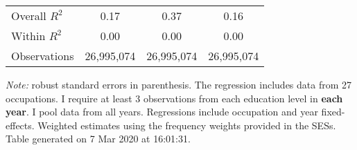 \begin{center}
\begin{threeparttable}[!h]
\begin{tabular}{lccc}
\midrule Overall $ R^2$&        0.17         &        0.37         &        0.16         \\
Within $ R^2$       &        0.00         &        0.00         &        0.00         \\
Observations        &  26,995,074         &  26,995,074         &  26,995,074         \\
\bottomrule
\bottomrule
\end{tabular}
\begin{tablenotes}
\item\footnotesize\textit{Note:} robust standard errors in parenthesis. The regression includes data from 27 occupations. I require at least 3 observations from each education level in \textbf{each year}. I pool data from all years. Regressions include occupation and year fixed-effects. Weighted estimates using the frequency weights provided in the SESs. Table generated on  7 Mar 2020 at 16:01:31.
\end{tablenotes}
\end{threeparttable}
\end{center}
